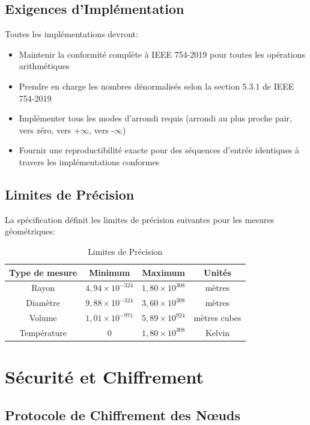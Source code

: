 \documentclass[12pt]{book}
\begin{document}
\section{Exigences d'Implémentation}

Toutes les implémentations devront:

\begin{itemize}
\item Maintenir la conformité complète à IEEE 754-2019 pour toutes les opérations arithmétiques
\item Prendre en charge les nombres dénormalisés selon la section 5.3.1 de IEEE 754-2019
\item Implémenter tous les modes d'arrondi requis (arrondi au plus proche pair, vers zéro, vers +$\infty$, vers -$\infty$)
\item Fournir une reproductibilité exacte pour des séquences d'entrée identiques à travers les implémentations conformes
\end{itemize}

\section{Limites de Précision}

La spécification définit les limites de précision suivantes pour les mesures géométriques:

\begin{table}[h]
\centering
\begin{tabular}{|c|c|c|c|}
\hline
Type de mesure & Minimum & Maximum & Unités \\
\hline
Rayon & $4,94 \times 10^{-324}$ & $1,80 \times 10^{308}$ & mètres \\
\hline
Diamètre & $9,88 \times 10^{-324}$ & $3,60 \times 10^{308}$ & mètres \\
\hline
Volume & $1,01 \times 10^{-971}$ & $5,89 \times 10^{924}$ & mètres cubes \\
\hline
Température & 0 & $1,80 \times 10^{308}$ & Kelvin \\
\hline
\end{tabular}
\caption{Limites de Précision}
\end{table}

\chapter{Sécurité et Chiffrement}

\section{Protocole de Chiffrement des Nœuds}
\end{document}

